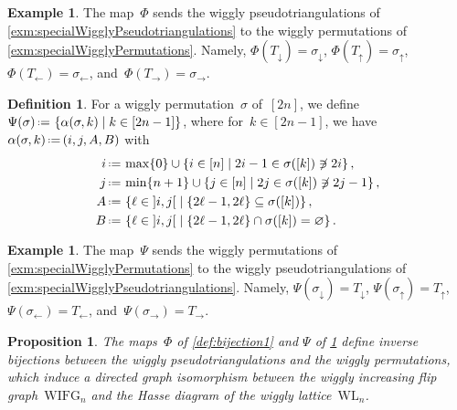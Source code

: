 \documentclass{amsart}
\newtheorem{proposition}[theorem]{Proposition}
\theoremstyle{definition}
\newtheorem{definition}[theorem]{Definition}
\newtheorem{example}[theorem]{Example}
\newcommand{\set}[2]{\left\{ #1 \;\middle|\; #2 \right\}} %
\newcommand{\eqdef}{\mbox{\,\raisebox{0.2ex}{\scriptsize\ensuremath{\mathrm:}}\ensuremath{=}\,}} %
\newcommand{\wigglyIncreasingFlipGraph}{\mathrm{WIFG}} %
\newcommand{\wigglyLattice}{\mathrm{WL}} %
\begin{document}
\begin{example}
The map~$\Phi$ sends the wiggly pseudotriangulations of \cref{exm:specialWigglyPseudotriangulations} to the wiggly permutations of \cref{exm:specialWigglyPermutations}.
Namely, $\Phi(T_\downarrow) = \sigma_\downarrow$, $\Phi(T_\uparrow) = \sigma_\uparrow$, $\Phi(T_\leftarrow) = \sigma_\leftarrow$, and~$\Phi(T_\rightarrow) = \sigma_\rightarrow$.
\end{example}

\begin{definition}
\label{def:bijection2}
For a wiggly permutation~$\sigma$ of~$[2n]$, we define~$\Psi(\sigma) \eqdef \set{\alpha(\sigma, k)}{k \in [2n-1]}$, where for~$k \in [2n-1]$, we have~$\alpha(\sigma, k) \eqdef ( i, j, A, B)$ with
\begin{align*}
i & \eqdef \max \{0\} \cup \set{i \in [n]}{2i-1 \in \sigma([k]) \not\ni 2i}, \\
j & \eqdef \min \{n+1\} \cup \set{j \in [n]}{2j \in \sigma([k]) \not\ni 2j-1}, \\
A & \eqdef \set{\ell \in {]i,j[}}{\{2\ell-1, 2\ell\} \subseteq \sigma([k])}, \\
B & \eqdef \set{\ell \in {]i,j[}}{\{2\ell-1, 2\ell\} \cap \sigma([k]) = \varnothing}.
\end{align*}
\end{definition}

\begin{example}
The map~$\Psi$ sends the wiggly permutations of \cref{exm:specialWigglyPermutations} to the wiggly pseudotriangulations of \cref{exm:specialWigglyPseudotriangulations}.
Namely, $\Psi(\sigma_\downarrow) = T_\downarrow$, $\Psi(\sigma_\uparrow) = T_\uparrow$, $\Psi(\sigma_\leftarrow) = T_\leftarrow$, and~$\Psi(\sigma_\rightarrow) = T_\rightarrow$.
\end{example}

\begin{proposition}
\label{prop:bijection}
The maps~$\Phi$ of \cref{def:bijection1} and $\Psi$ of \cref{def:bijection2} define inverse bijections between the wiggly pseudotriangulations and the wiggly permutations, which induce a directed graph isomorphism between the wiggly increasing flip graph~$\wigglyIncreasingFlipGraph_n$ and the Hasse diagram of the wiggly lattice~$\wigglyLattice_n$.
\end{proposition}
\end{document}
